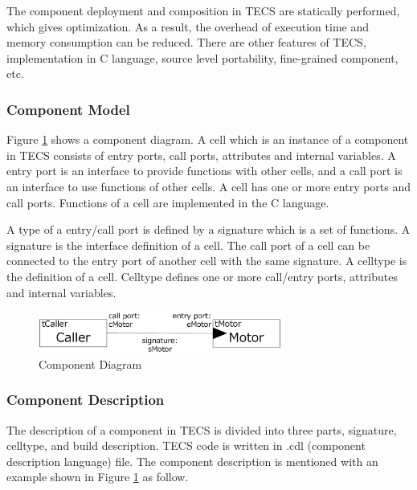 \documentclass{sig-alternate-05-2015}
\begin{document}
The component deployment and composition in TECS are statically performed, which gives optimization.
As a result, the overhead of execution time and memory consumption can be reduced.
There are other features of TECS, implementation in C language, source level portability, fine-grained component, etc.

\subsubsection{Component Model}
Figure \ref{fig:component} shows a component diagram.
A {\myit cell} which is an instance of a component in TECS consists of {\myit entry} ports, {\myit call} ports, attributes and internal variables.
A {\myit entry} port is an interface to provide functions with other {\myit cell}s, and a {\myit call} port is an interface to use functions of other {\myit cell}s.
A {\myit cell} has one or more {\myit entry} ports and {\myit call} ports.
Functions of a {\myit cell} are implemented in the C language.

A type of a {\myit entry}/{\myit call} port is defined by a {\myit signature} which is a set of functions.
A {\myit signature} is the interface definition of a {\myit cell}.
The {\myit call} port of a {\myit cell} can be connected to the {\myit entry} port of another {\myit cell} with the same {\myit signature}.
A {\myit celltype} is the definition of a {\myit cell}.
{\myit Celltype} defines one or more {\myit call}/{\myit entry} ports, attributes and internal variables.

\begin{figure}[t]
    \centering
    \includegraphics[width=8cm,clip]{figure/component_diagram.eps}
    \caption{Component Diagram}
    \label{fig:component}
\end{figure}

\subsubsection{Component Description}
The description of a component in TECS is divided into three parts, {\myit signature}, {\myit celltype}, and build description.
TECS code is written in .cdl (component description language) file.
The component description is mentioned with an example shown in Figure \ref{fig:component} as follow.
\end{document}
